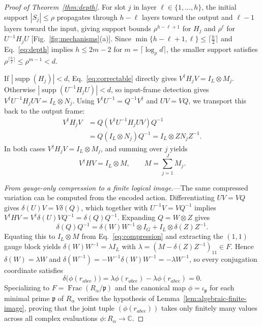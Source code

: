 \documentclass[aps,prl,reprint,notitlepage,nofootinbib,nobibnotes]{revtex4-2}
\newcommand{\id}{I}
\begin{document}
\begin{proof}[Proof of Theorem~\ref{thm:depth}]
For slot $j$ in layer $\ell\in\{1,\ldots,h\}$, the initial support $|S_j|\le\rho$ propagates
through $h-\ell$ layers toward the output and $\ell-1$ layers toward the input, giving support
bounds $\rho^{h-\ell+1}$ for $H_j$ and $\rho^\ell$ for $U^{-1}H_jU$ [Fig.~\ref{fig:mechanisms}(a)].
Since $\min\{h-\ell+1,\ell\}\le\lceil \frac{h}{2}\rceil$ and Eq.~\eqref{eq:depth} implies $h\le
2m-2$ for $m=\lceil\log_\rho d\rceil$, the smaller support satisfies $\rho^{\lceil
\frac{h}{2}\rceil}\le\rho^{m-1}<d$.

If $|\operatorname{supp}(H_j)|<d$, Eq.~\eqref{eq:correctable} directly gives $V^\dagger
H_jV=\id_L\otimes M_j$. Otherwise $|\operatorname{supp}(U^{-1}H_jU)|<d$, so input-frame detection
gives $V^\dagger U^{-1}H_jUV=\id_L\otimes N_j$. Using $V^\dagger U^{-1}=Q^{-1}V^\dagger$ and
$UV=VQ$, we transport this back to the output frame:
\begin{align*}
 V^\dagger H_jV &= Q(V^\dagger U^{-1}H_jUV)Q^{-1} \\
                &= Q(\id_L\otimes N_j)Q^{-1} = \id_L\otimes ZN_jZ^{-1}.
\end{align*}
In both cases $V^\dagger H_jV=\id_L\otimes M_j$, and summing over $j$ yields
\begin{equation}\label{eq:compression}
 V^\dagger HV=\id_L\otimes M,\qquad M=\sum_{j=1}^J M_j.
\end{equation}

\emph{From gauge-only compression to a finite logical image.}---The same compressed variation can
be computed from the encoded action. Differentiating $UV=VQ$ gives $\delta(U)V=V\delta(Q)$, which
together with $U^{-1}V=VQ^{-1}$ implies $V^\dagger HV=V^\dagger\delta(U)VQ^{-1}=\delta(Q)Q^{-1}$.
Expanding $Q=W\otimes Z$ gives
\begin{equation}\label{eq:logicalgen}
 \delta(Q)Q^{-1}
   =\delta(W)W^{-1}\otimes\id_G+\id_L\otimes\delta(Z)Z^{-1}.
\end{equation}
Equating this to $\id_L\otimes M$ from Eq.~\eqref{eq:compression} and extracting the $(1,1)$ gauge
block yields $\delta(W)W^{-1}=\lambda\id_L$ with $\lambda=(M-\delta(Z)Z^{-1})_{11}\in F$. Hence
$\delta(W)=\lambda W$ and $\delta(W^{-1})=-W^{-1}\delta(W)W^{-1}=-\lambda W^{-1}$, so every
conjugation coordinate satisfies
\[
 \delta\bigl(\phi(r_{abce})\bigr)
   =\lambda\phi(r_{abce})-\lambda\phi(r_{abce})=0.
\]
Specializing to $F=\operatorname{Frac}(R_\alpha/\mathfrak p)$ and the canonical map
$\phi=\iota_{\mathfrak p}$ for each minimal prime $\mathfrak p$ of $R_\alpha$ verifies the
hypothesis of Lemma~\ref{lem:algebraic-finite-image}, proving that the joint tuple
$(\phi(r_{abce}))$ takes only finitely many values across all complex evaluations
$\phi:R_\alpha\to\mathbb C$.


\end{proof}
\end{document}
